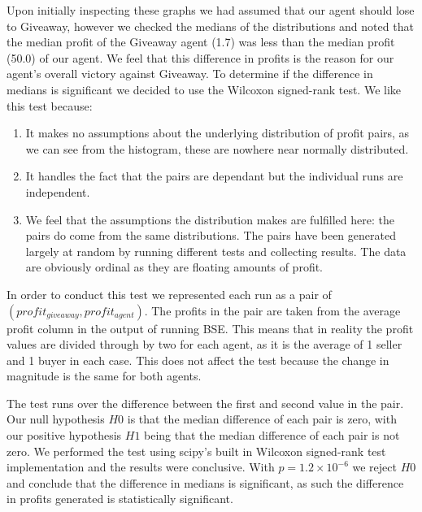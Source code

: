 \documentclass{acm_proc_article-sp}
\begin{document}
\newpage
Upon initially inspecting these graphs we had assumed that our agent should
lose to Giveaway, however we checked the medians of the distributions and noted
that the median profit of the Giveaway agent (1.7) was less than the median
profit (50.0) of our agent. We feel that this difference in profits is the
reason for our agent's overall victory against Giveaway. To determine if the
difference in medians is significant we decided to use the Wilcoxon signed-rank
test\cite{wiki:wilcoxon}. We like this test because:

\begin{enumerate}
\item It makes no assumptions about the underlying
distribution of profit pairs, as we can see from the histogram, these are
nowhere near normally distributed.

\item It handles the fact that the pairs are dependant but the individual runs
are independent.

\item We feel that the assumptions the distribution makes are fulfilled here:
the pairs do come from the same distributions. The pairs have been generated
largely at random by running different tests and collecting results. The data
are obviously ordinal as they are floating amounts of profit.

\end{enumerate}

In order to conduct this test we represented each run as a pair of
$(profit_{giveaway}, profit_{agent})$. The profits in the pair are taken from
the average profit column in the output of running BSE. This means that in
reality the profit values are divided through by two for each agent, as it is
the average of 1 seller and 1 buyer in each case. This does not affect the test
because the change in magnitude is the same for both agents.

The test runs over the difference between the first and second value in the
pair. Our null hypothesis $H0$ is that the median difference of each pair is
zero, with our positive hypothesis $H1$ being that the median difference of
each pair is not zero. We performed the test using scipy's built in Wilcoxon
signed-rank test implementation\cite{scipy:wilcoxon} and the results were
conclusive.  With $p=1.2\times10^{-6}$ we reject $H0$ and conclude
that the difference in medians is significant, as such the difference in
profits generated is statistically significant.
\end{document}

